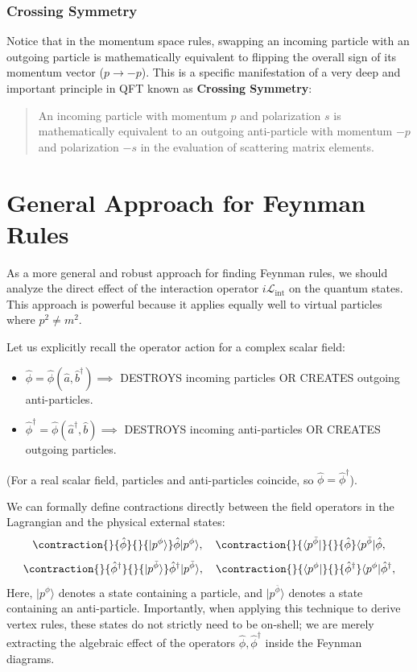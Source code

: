 \subsubsection{Crossing Symmetry}
Notice that in the momentum space rules, swapping an incoming particle with an outgoing particle is mathematically equivalent to flipping the overall sign of its momentum vector ($p \to -p$). This is a specific manifestation of a very deep and important principle in QFT known as \textbf{Crossing Symmetry}:
\begin{quote}
    An incoming particle with momentum $p$ and polarization $s$ is mathematically equivalent to an outgoing anti-particle with momentum $-p$ and polarization $-s$ in the evaluation of scattering matrix elements.
\end{quote}


\section{General Approach for Feynman Rules}

As a more general and robust approach for finding Feynman rules, we should analyze the direct effect of the interaction operator $i \mathcal{L}_{\text{int}}$ on the quantum states. This approach is powerful because it applies equally well to virtual particles where $p^2 \neq m^2$.

Let us explicitly recall the operator action for a complex scalar field:
\begin{itemize}
    \item $\hat{\phi} = \hat{\phi}(\hat{a}, \hat{b}^\dagger) \implies$ DESTROYS incoming particles OR CREATES outgoing anti-particles.
    \item $\hat{\phi}^\dagger = \hat{\phi}(\hat{a}^\dagger, \hat{b}) \implies$ DESTROYS incoming anti-particles OR CREATES outgoing particles.
\end{itemize}
(For a real scalar field, particles and anti-particles coincide, so $\hat{\phi} = \hat{\phi}^\dagger$).

We can formally define contractions directly between the field operators in the Lagrangian and the physical external states:
\[
    \contraction{}{\hat{\phi}}{}{| p^{\phi}\rangle} \hat{\phi} | p^{\phi} \rangle, \quad \contraction{}{\langle p^{\bar{\phi}} |}{}{\hat{\phi}} \langle p^{\bar{\phi}} | \hat{\phi},
\]
\[
    \contraction{}{\hat{\phi}^\dagger}{}{| p^{\bar{\phi}}\rangle} \hat{\phi}^\dagger | p^{\bar{\phi}} \rangle, \quad \contraction{}{\langle p^{\phi} |}{}{\hat{\phi}^\dagger} \langle p^{\phi} | \hat{\phi}^\dagger,
\]
Here, $|p^{\phi}\rangle$ denotes a state containing a particle, and $|p^{\bar{\phi}}\rangle$ denotes a state containing an anti-particle. Importantly, when applying this technique to derive vertex rules, these states do not strictly need to be on-shell; we are merely extracting the algebraic effect of the operators $\hat{\phi}, \hat{\phi}^\dagger$ inside the Feynman diagrams.

